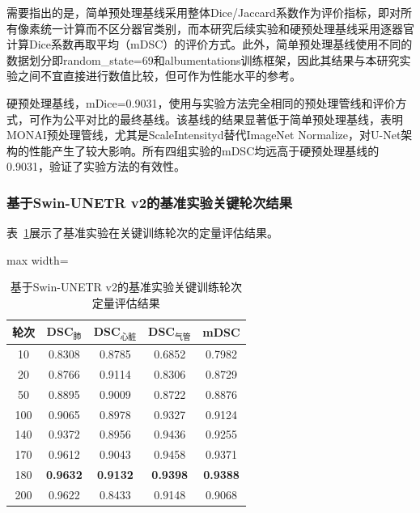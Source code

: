 \documentclass[12pt, a4paper]{article}
\begin{document}
需要指出的是，简单预处理基线采用整体Dice/Jaccard系数作为评价指标，即对所有像素统一计算而不区分器官类别，而本研究后续实验和硬预处理基线采用逐器官计算Dice系数再取平均（mDSC）的评价方式。此外，简单预处理基线使用不同的数据划分即random\_state=69和albumentations训练框架，因此其结果与本研究实验之间不宜直接进行数值比较，但可作为性能水平的参考。

硬预处理基线，mDice=0.9031，使用与实验方法完全相同的预处理管线和评价方式，可作为公平对比的最终基线。该基线的结果显著低于简单预处理基线，表明MONAI预处理管线，尤其是ScaleIntensityd替代ImageNet Normalize，对U-Net架构的性能产生了较大影响。所有四组实验的mDSC均远高于硬预处理基线的0.9031，验证了实验方法的有效性。

\subsubsection{基于Swin-UNETR v2的基准实验关键轮次结果}

表~\ref{tab:results_exp1}展示了基准实验在关键训练轮次的定量评估结果。

\begin{table}[H]
    \centering
    \caption{基于Swin-UNETR v2的基准实验关键训练轮次定量评估结果}
    \label{tab:results_exp1}
    \small
    \begin{adjustbox}{max width=\textwidth}
    \begin{tabular}{@{}ccccc@{}}
        \toprule
        \textbf{轮次} & \textbf{DSC$_\text{肺}$} & \textbf{DSC$_\text{心脏}$} & \textbf{DSC$_\text{气管}$} & \textbf{mDSC} \\
        \midrule
        10 & 0.8308 & 0.8785 & 0.6852 & 0.7982 \\
        20 & 0.8766 & 0.9114 & 0.8306 & 0.8729 \\
        50 & 0.8895 & 0.9009 & 0.8722 & 0.8876 \\
        100 & 0.9065 & 0.8978 & 0.9327 & 0.9124 \\
        140 & 0.9372 & 0.8956 & 0.9436 & 0.9255 \\
        170 & 0.9612 & 0.9043 & 0.9458 & 0.9371 \\
        180 & \textbf{0.9632} & \textbf{0.9132} & \textbf{0.9398} & \textbf{0.9388} \\
        200 & 0.9622 & 0.8433 & 0.9148 & 0.9068 \\
        \bottomrule
    \end{tabular}
    \end{adjustbox}
\end{table}
\end{document}
